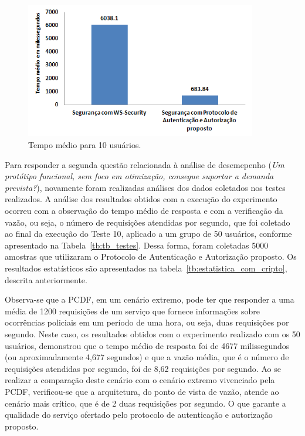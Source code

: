 \begin{figure}[!htb]
    \centering
    \includegraphics[width=0.9\textwidth]{comparativowssecurity.png}
    \caption{Tempo médio para 10 usuários.}
    \label{fig:comparativowssecurity}
\end{figure} 


Para responder a segunda questão relacionada \`{a} an\'{a}lise de desemepenho (\emph{Um protótipo funcional, sem foco em otimização, consegue suportar a demanda prevista?}), novamente foram realizadas análises dos dados coletados nos testes realizados. A análise dos resultados obtidos com a execução do experimento ocorreu com a observação do tempo médio de resposta e com a verificação da vazão, ou seja, o número de requisições atendidas por segundo, que foi coletado ao final da execução do Teste 10, aplicado a um grupo de 50 usuários, conforme apresentado na Tabela~\ref{tb:tb_testes}. Dessa forma, foram coletadas 5000 amostras que utilizaram o Protocolo de Autenticação e Autorização proposto. Os resultados estatísticos são apresentados na tabela~\ref{tb:estatistica_com_cripto}, descrita anteriormente.

Observa-se que a PCDF, em um cenário extremo, pode ter que responder a uma média de 1200 requisições de um serviço que fornece informações sobre ocorrências policiais em um período de uma hora, ou seja, duas requisições por segundo. Neste caso, os resultados obtidos com o experimento realizado com os 50 usuários, demonstrou que o tempo médio de resposta foi de 4677 milissegundos (ou aproximadamente 4,677 segundos) e que a vazão média, que é o número de requisições atendidas por segundo, foi de 8,62 requisições por segundo. Ao se realizar a comparação deste cenário com o cenário extremo vivenciado pela PCDF, verificou-se que a arquitetura, do ponto de vista de vazão, atende ao cen\'{a}rio mais cr\'{i}tico, que é de 2 duas requisições por segundo. O que garante a qualidade do serviço ofertado pelo protocolo de autenticação e autorização proposto.


